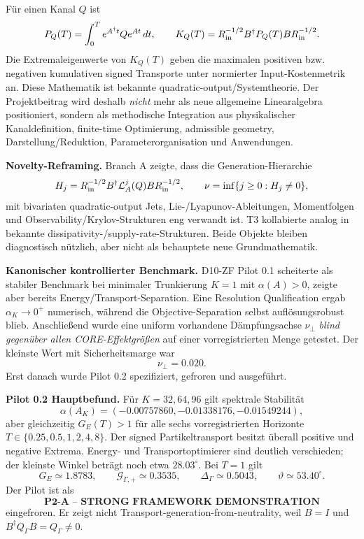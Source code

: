 Für einen Kanal $Q$ ist
\[
P_Q(T)=\int_0^T e^{A^\dagger t}Qe^{At}\,dt,
\qquad
K_Q(T)=R_{\rm in}^{-1/2}B^\dagger P_Q(T)B R_{\rm in}^{-1/2}.
\]
Die Extremaleigenwerte von $K_Q(T)$ geben die maximalen positiven bzw. negativen kumulativen signed Transporte unter normierter Input-Kostenmetrik an. Diese Mathematik ist bekannte quadratic-output/Systemtheorie. Der Projektbeitrag wird deshalb \emph{nicht} mehr als neue allgemeine Linearalgebra positioniert, sondern als methodische Integration aus physikalischer Kanaldefinition, finite-time Optimierung, admissible geometry, Darstellung/Reduktion, Parameterorganisation und Anwendungen.

\textbf{Novelty-Reframing.} Branch A zeigte, dass die Generation-Hierarchie
\[
H_j=R_{\rm in}^{-1/2}B^\dagger \mathcal L_A^j(Q)B R_{\rm in}^{-1/2},
\qquad
\nu=\inf\{j\ge0:H_j\neq0\},
\]
mit bivariaten quadratic-output Jets, Lie-/Lyapunov-Ableitungen, Momentfolgen und Observability/Krylov-Strukturen eng verwandt ist. T3 kollabierte analog in bekannte dissipativity-/supply-rate-Strukturen. Beide Objekte bleiben diagnostisch nützlich, aber nicht als behauptete neue Grundmathematik.

\textbf{Kanonischer kontrollierter Benchmark.} D10-ZF Pilot 0.1 scheiterte als stabiler Benchmark bei minimaler Trunkierung $K=1$ mit $\alpha(A)>0$, zeigte aber bereits Energy/Transport-Separation. Eine Resolution Qualification ergab $\alpha_K\to0^+$ numerisch, während die Objective-Separation selbst auflösungsrobust blieb. Anschließend wurde eine uniform vorhandene Dämpfungsachse $\nu_\perp$ \emph{blind gegenüber allen CORE-Effektgrößen} auf einer vorregistrierten Menge getestet. Der kleinste Wert mit Sicherheitsmarge war
\[
\boxed{\nu_\perp=0.020}.
\]
Erst danach wurde Pilot 0.2 spezifiziert, gefroren und ausgeführt.

\textbf{Pilot 0.2 Hauptbefund.} Für $K=32,64,96$ gilt spektrale Stabilität
\[
\alpha(A_K)=(-0.00757860,-0.01338176,-0.01549244),
\]
aber gleichzeitig $G_E(T)>1$ für alle sechs vorregistrierten Horizonte $T\in\{0.25,0.5,1,2,4,8\}$. Der signed Partikeltransport besitzt überall positive und negative Extrema. Energy- und Transportoptimierer sind deutlich verschieden; der kleinste Winkel beträgt noch etwa $28.03^\circ$. Bei $T=1$ gilt
\[
G_E\simeq1.8783,
\qquad
\mathcal G_{\Gamma,+}\simeq0.3535,
\qquad
\Delta_\Gamma\simeq0.5043,
\qquad
\vartheta\simeq53.40^\circ.
\]
Der Pilot ist als
\[
\boxed{\textbf{P2-A -- STRONG FRAMEWORK DEMONSTRATION}}
\]
eingefroren. Er zeigt nicht Transport-generation-from-neutrality, weil $B=I$ und $B^\dagger Q_\Gamma B=Q_\Gamma\neq0$.

